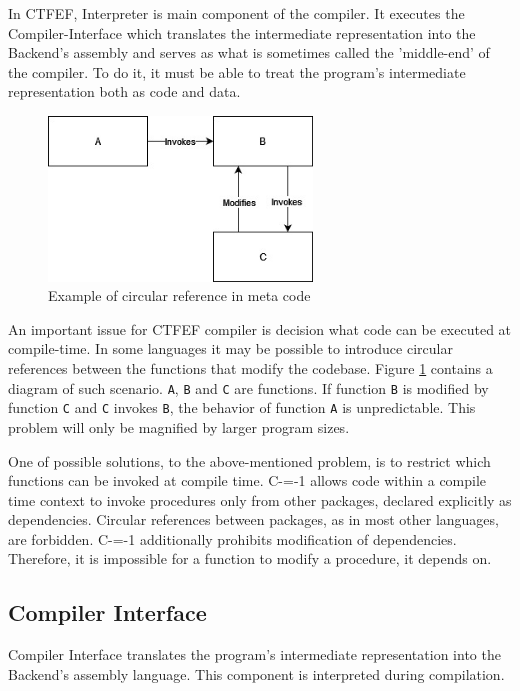 In CTFEF, Interpreter is main component of the compiler.
It executes the Compiler-Interface which translates the intermediate representation into the Backend's assembly and serves as what is sometimes called the 'middle-end' of the compiler\cite{hsu2021llvm}.
To do it, it must be able to treat the program's intermediate representation both as code and data.

\begin{figure}
	\includegraphics[width=7cm]{pictures/circular-function-reference.jpg}
	\caption{Example of circular reference in meta code}
	\label{circular-function-reference}
\end{figure}

An important issue for CTFEF compiler is decision what code can be executed at compile-time.
In some languages it may be possible to introduce circular references between the functions that modify the codebase.
Figure \ref{circular-function-reference} contains a diagram of such scenario.
\lstinline{A}, \lstinline{B} and \lstinline{C} are functions.
If function \lstinline{B} is modified by function \lstinline{C} and \lstinline{C} invokes \lstinline{B}, the behavior of function \lstinline{A} is unpredictable.
This problem will only be magnified by larger program sizes.

One of possible solutions, to the above-mentioned problem, is to restrict which functions can be invoked at compile time.
C-=-1 allows code within a compile time context to invoke procedures only from other packages, declared explicitly as dependencies.
Circular references between packages, as in most other languages, are forbidden.
C-=-1 additionally  prohibits modification of dependencies.
Therefore, it is impossible for a function to modify a procedure, it depends on.

\subsection{Compiler Interface}
\label{compiler-interface}

Compiler Interface translates the program's intermediate representation into the Backend's assembly language.
This component is interpreted during compilation.

